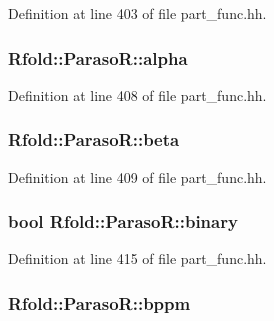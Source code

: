 Definition at line 403 of file part\+\_\+func.\+hh.

\hypertarget{class_rfold_1_1_paraso_r_a9f5a209eb1cd9de0f4f01c23f4f5e111}{
\subsubsection[{alpha}]{ Rfold\+::\+Paraso\+R\+::alpha}}\label{class_rfold_1_1_paraso_r_a9f5a209eb1cd9de0f4f01c23f4f5e111}


Definition at line 408 of file part\+\_\+func.\+hh.

\hypertarget{class_rfold_1_1_paraso_r_a4ebc3071b4f1aa34c75af71d88cf7382}{
\subsubsection[{beta}]{ Rfold\+::\+Paraso\+R\+::beta}}\label{class_rfold_1_1_paraso_r_a4ebc3071b4f1aa34c75af71d88cf7382}


Definition at line 409 of file part\+\_\+func.\+hh.

\hypertarget{class_rfold_1_1_paraso_r_af2bb3eef2ea5d6f92d490f2a36c8ab64}{
\subsubsection[{binary}]{\setlength{\rightskip}{0pt plus 5cm}bool Rfold\+::\+Paraso\+R\+::binary}}\label{class_rfold_1_1_paraso_r_af2bb3eef2ea5d6f92d490f2a36c8ab64}


Definition at line 415 of file part\+\_\+func.\+hh.

\hypertarget{class_rfold_1_1_paraso_r_a0372b87e995aa99226a2e5c0bda44800}{
\subsubsection[{bppm}]{ Rfold\+::\+Paraso\+R\+::bppm}}\label{class_rfold_1_1_paraso_r_a0372b87e995aa99226a2e5c0bda44800}


